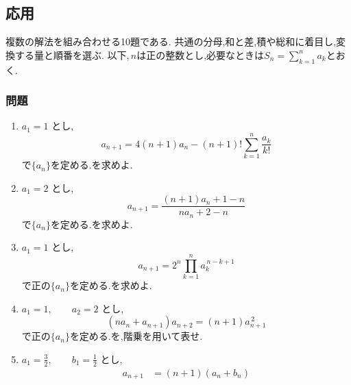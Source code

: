     \subsection{応用}\label{節：応用難易度}\label{節：高難易度のもの}
      複数の解法を組み合わせる10題である.
                共通の分母,和と差,積や総和に着目し,変換する量と順番を選ぶ.
      以下,\,$n$は正の整数とし,必要なときは$S_n=\sum_{k=1}^{n}a_k$とおく.

      \subsubsection{問題}\label{節：応用難易度：問題}\label{節：高難易度のもの：問題}
        \begin{enumerate}[label=\textbf{問\arabic*.},leftmargin=3.8em,format=\bookitemlink{practice-advanced}{problem}{answer}]
          \item $\displaystyle a_1=1$ とし,
                \[
                  a_{n+1}
                  =4(n+1)a_n
                    -(n+1)!\sum_{k=1}^{n}\frac{a_k}{k!}
                \]
                で$\{a_n\}$を定める.を求めよ.
          \item $\displaystyle a_1=2$ とし,
                \[
                  a_{n+1}
                   =\frac{(n+1)a_n+1-n}{na_n+2-n}
                \]
                で$\{a_n\}$を定める.を求めよ.
          \item $\displaystyle a_1=1$ とし,
                \[
                  a_{n+1}
                   =2^n\prod_{k=1}^{n}a_k^{\,n-k+1}
                \]
                で正の$\{a_n\}$を定める.を求めよ.
          \item $\displaystyle a_1=1,\qquad a_2=2$ とし,
                \[
                  (na_n+a_{n+1})a_{n+2}
                    =(n+1)a_{n+1}^{\,2}
                \]
                で正の$\{a_n\}$を定める.を,階乗を用いて表せ.
          \item $\displaystyle a_1=\frac32,\qquad b_1=\frac12$ とし,
                \begin{align*}
                 a_{n+1}
                  &=(n+1)(a_n+b_n)\\

\end{align*}
\end{enumerate}
